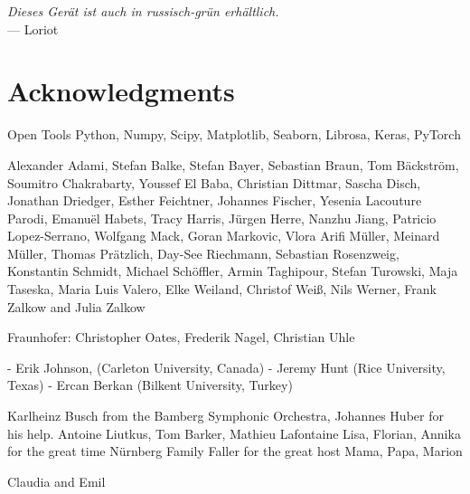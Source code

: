
\begin{flushright}{\slshape
    Dieses Gerät ist auch in russisch-grün erhältlich.
    }\\ \medskip
    --- Loriot
\end{flushright}



\bigskip

\begingroup
\let\clearpage\relax
\let\cleardoublepage\relax
\let\cleardoublepage\relax
\chapter*{Acknowledgments}
Open Tools
Python, Numpy, Scipy, Matplotlib, Seaborn, Librosa, Keras, PyTorch

Alexander Adami, Stefan Balke, Stefan Bayer, Sebastian Braun, Tom Bäckström, Soumitro Chakrabarty, 
Youssef El Baba, Christian Dittmar, Sascha Disch, Jonathan Driedger, Esther Feichtner, Johannes Fischer, 
Yesenia Lacouture Parodi, Emanuël Habets, Tracy Harris, Jürgen Herre, Nanzhu Jiang, 
Patricio Lopez-Serrano, Wolfgang Mack, Goran Markovic, Vlora Arifi Müller, Meinard Müller, Thomas Prätzlich, 
Day-See Riechmann, Sebastian Rosenzweig, Konstantin Schmidt, Michael Schöffler, Armin Taghipour, 
Stefan Turowski, Maja Taseska, Maria Luis Valero, Elke Weiland, Christof Weiß, Nils Werner, 
Frank Zalkow and Julia Zalkow

Fraunhofer: Christopher Oates, Frederik Nagel, Christian Uhle

- Erik Johnson, (Carleton University, Canada) 
- Jeremy Hunt (Rice University, Texas)
- Ercan Berkan (Bilkent University, Turkey)

\bigskip
Karlheinz Busch from the Bamberg Symphonic Orchestra, Johannes Huber for his help.
Antoine Liutkus, Tom Barker, Mathieu Lafontaine
\bigskip
Lisa, Florian, Annika for the great time Nürnberg
\bigskip
Family Faller for the great host
Mama, Papa, Marion

\bigskip

Claudia and Emil

\endgroup
